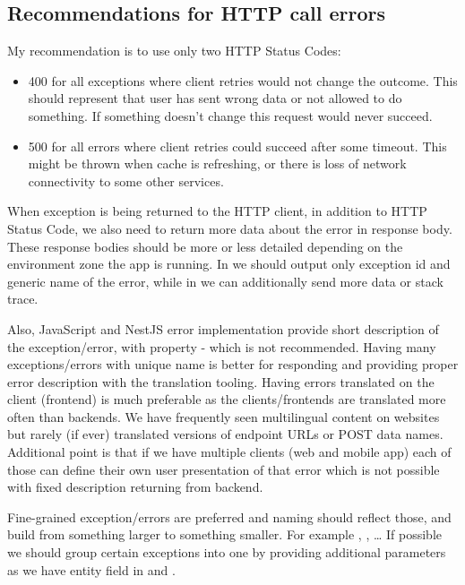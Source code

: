 \subsection{Recommendations for HTTP call errors}\label{subsec:recommendations-for-http-call-errors}

My recommendation is to use only two HTTP Status Codes:
\begin{itemize}
    \item 400 for all exceptions where client retries would not change the outcome.
    This should represent that user has sent wrong data or not allowed to do something.
    If something doesn't change this request would never succeed.
    \item 500 for all errors where client retries could succeed after some timeout.
    This might be thrown when cache is refreshing, or there is loss of network connectivity
    to some other services.
\end{itemize}

When exception is being returned to the HTTP client, in addition to HTTP Status Code,
we also need to return more data about the error in response body.
These response bodies should be more or less detailed depending on the environment zone the app is running.
In  we should output only exception id and generic name of the error,
while in  we can additionally send more data or stack trace.

Also, JavaScript and NestJS error implementation provide short description of the exception/error,
with  property - which is not recommended.
Having many exceptions/errors with unique name is better for responding and providing proper error description with
the translation tooling.
Having errors translated on the client (frontend) is much preferable as the clients/frontends are translated
more often than backends.
We have frequently seen multilingual content on websites but rarely (if ever) translated versions of endpoint URLs or
POST data names.
Additional point is that if we have multiple clients (web and mobile app) each of those can define their own user
presentation of that error which is not possible with fixed description returning from backend.

Fine-grained exception/errors are preferred and naming should reflect those, and build from something larger
to something smaller.
For example , , \ldots
If possible we should group certain exceptions into one by providing additional parameters as we have entity field
in 
and .

